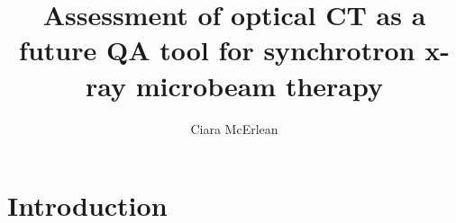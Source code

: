 \documentclass[12pt]{article}
\begin{document}
 
\title{Assessment of optical CT as a future QA tool for synchrotron x-ray microbeam therapy } 
\author{Ciara McErlean}

\section{Introduction}
\label{sec:intro}
\end{document}
